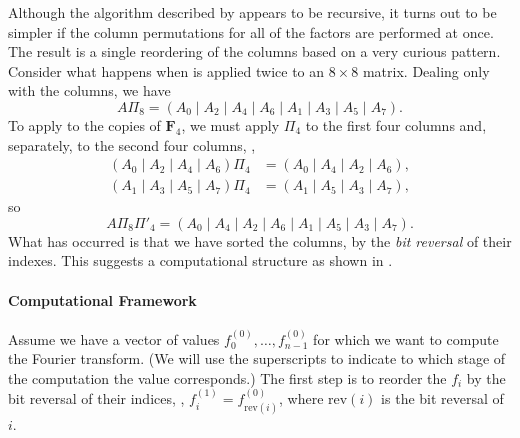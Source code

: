 \smallskip
Although the algorithm described by  appears to
be recursive, it turns out to be simpler if the column permutations
for all of the factors are performed at once.  The result is a single
reordering of the columns based on a very curious pattern.  Consider
what happens when
 is applied twice to an $8\times8$ matrix.
Dealing only with the columns, we have
\[
A\Pi_8 = (A_0 \mid A_2 \mid A_4 \mid A_6 \mid A_1 \mid A_3 \mid A_5 \mid A_7).
\]
To apply  to the copies of $\mathbf{F}_4$, we must
apply $\Pi_4$ to the first four columns and, separately, to the second
four columns, \ie,
\[
\begin{aligned}
(A_0 \mid A_2 \mid A_4 \mid A_6) \Pi_4 & = (A_0 \mid A_4 \mid A_2 \mid A_6),\\
(A_1 \mid A_3 \mid A_5 \mid A_7) \Pi_4 & = (A_1 \mid A_5 \mid A_3 \mid A_7),
\end{aligned}
\]
so
\[
A\Pi_8\Pi'_4 = 
  (A_0 \mid A_4 \mid A_2 \mid A_6 \mid A_1 \mid A_5 \mid A_3 \mid A_7).
\]
What has occurred is that we have sorted the columns, by the {\em bit
reversal} of their indexes.  This suggests a computational structure
as shown in .

\paragraph{Computational Framework}

Assume we have a vector of values $f^{(0)}_0, \ldots, f^{(0)}_{n-1}$
for which we want to compute the Fourier transform.  (We will use the
superscripts to indicate to which stage of the computation the value
corresponds.)  The first step is to reorder the $f_i$ by the bit
reversal of their indices, \ie, $f^{(1)}_i = f^{(0)}_{\mbox{rev}(i)}$,
where $\mbox{rev}(i)$ is the bit reversal of $i$.

